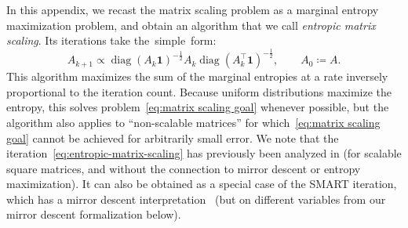 \documentclass[11pt,letterpaper]{article}
\numberwithin{equation}{section}
\DeclareMathOperator{\diag}{diag}
\begin{document}
In this appendix, we recast the matrix scaling problem as a marginal entropy maximization problem, and obtain an algorithm that we call \emph{entropic matrix scaling}.
Its iterations take the~simple~form:
\begin{equation}\label{eq:entropic-matrix-scaling}
A_{k+1} \propto \diag(A_k\bm{1})^{-\frac{1}{2}} A_k \diag( A_k^{\top}\bm{1})^{-\frac{1}{2}}, \qquad A_0\coloneqq A.
\end{equation}
This algorithm maximizes the sum of the marginal entropies at a rate inversely proportional to the iteration count.
Because uniform distributions maximize the entropy, this solves problem~\eqref{eq:matrix scaling goal} whenever possible, but the algorithm also applies to ``non-scalable matrices'' for which~\eqref{eq:matrix scaling goal} cannot be achieved for arbitrarily small error.
We note that the iteration~\eqref{eq:entropic-matrix-scaling} has previously been analyzed in \cite{knight2014symmetry} (for scalable square matrices, and without the connection to mirror descent or entropy maximization).
It can also be obtained as a special case of the SMART iteration, which has a mirror descent interpretation~\cite{raus2024accelerated} (but on different variables from our mirror descent formalization below).
\end{document}
